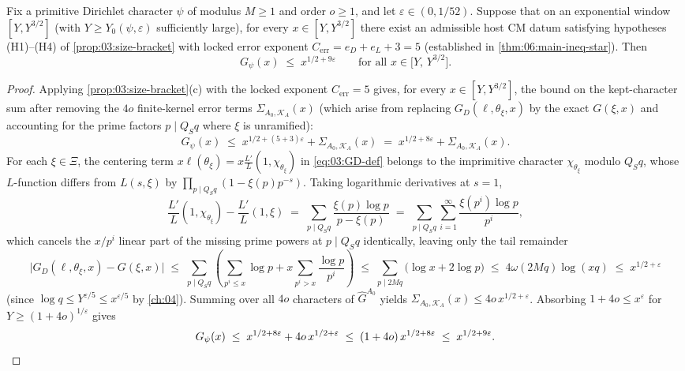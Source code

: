 \begin{theorem}
\label{thm:03:window-bound}
Fix a primitive Dirichlet character $\psi$ of modulus $M \ge 1$ and order $o \ge 1$, and let $\varepsilon \in (0, 1/52)$. Suppose that on an exponential window $[Y, Y^{3/2}]$ (with $Y \ge Y_0(\psi, \varepsilon)$ sufficiently large), for every $x \in [Y, Y^{3/2}]$ there exist an admissible host CM datum satisfying hypotheses \textup{(H1)--(H4)} of \cref{prop:03:size-bracket} with locked error exponent $C_{\mathrm{err}} = e_D + e_L + 3 = 5$ (established in \cref{thm:06:main-ineq-star}). Then
\begin{equation}
\label{eq:03:final-gpsi-bound}
  G_\psi(x) \;\le\; x^{1/2 + 9\varepsilon} \qquad \text{for all } x \in \bigl[Y,\, Y^{3/2}\bigr].
\end{equation}
\end{theorem}

\begin{proof}
Applying \cref{prop:03:size-bracket}(c) with the locked exponent $C_{\mathrm{err}} = 5$ gives, for every $x \in [Y, Y^{3/2}]$, the bound on the kept-character sum after removing the $4o$ finite-kernel error terms $\Sigma_{A_0, \mathcal{K}_A}(x)$ (which arise from replacing $G_D(\ell, \theta_\xi, x)$ by the exact $G(\xi, x)$ and accounting for the prime factors $p \mid Q_S q$ where $\xi$ is unramified):
\[
  G_\psi(x) \;\le\; x^{1/2 + (5 + 3)\varepsilon} + \Sigma_{A_0, \mathcal{K}_A}(x)
  \;=\; x^{1/2 + 8\varepsilon} + \Sigma_{A_0, \mathcal{K}_A}(x).
\]
For each $\xi \in \Xi$, the centering term $x\ell(\theta_\xi) = x\frac{L'}{L}(1, \chi_{\theta_\xi})$ in \eqref{eq:03:GD-def} belongs to the imprimitive character $\chi_{\theta_\xi}$ modulo $Q_S q$, whose $L$-function differs from $L(s, \xi)$ by $\prod_{p \mid Q_S q}(1 - \xi(p) p^{-s})$. Taking logarithmic derivatives at $s = 1$,
\[
  \frac{L'}{L}(1, \chi_{\theta_\xi}) - \frac{L'}{L}(1, \xi)
  \;=\; \sum_{p \mid Q_S q} \frac{\xi(p)\log p}{p - \xi(p)}
  \;=\; \sum_{p \mid Q_S q} \sum_{i = 1}^{\infty} \frac{\xi(p^i)\log p}{p^i},
\]
which cancels the $x/p^i$ linear part of the missing prime powers at $p \mid Q_S q$ identically, leaving only the tail remainder
\[
  \bigl|G_D(\ell, \theta_\xi, x) - G(\xi, x)\bigr|
  \;\le\; \sum_{p \mid Q_S q} \left(\sum_{p^i \le x} \log p + x \sum_{p^i > x} \frac{\log p}{p^i}\right)
  \;\le\; \sum_{p \mid 2M q} \bigl(\log x + 2\log p\bigr)
  \;\le\; 4\omega(2Mq)\log(x q) \;\le\; x^{1/2 + \varepsilon}
\]
(since $\log q \le Y^{\varepsilon/5} \le x^{\varepsilon/5}$ by \cref{ch:04}). Summing over all $4o$ characters of $\widehat{G}^{A_0}$ yields $\Sigma_{A_0, \mathcal{K}_A}(x) \le 4o\, x^{1/2 + \varepsilon}$. Absorbing $1 + 4o \le x^\varepsilon$ for $Y \ge (1 + 4o)^{1/\varepsilon}$ gives
\[
  G_\psi(x) \;\le\; x^{1/2 + 8\varepsilon} + 4o\, x^{1/2 + \varepsilon}
  \;\le\; (1 + 4o)\, x^{1/2 + 8\varepsilon}
  \;\le\; x^{1/2 + 9\varepsilon}. \qedhere
\]
\end{proof}

